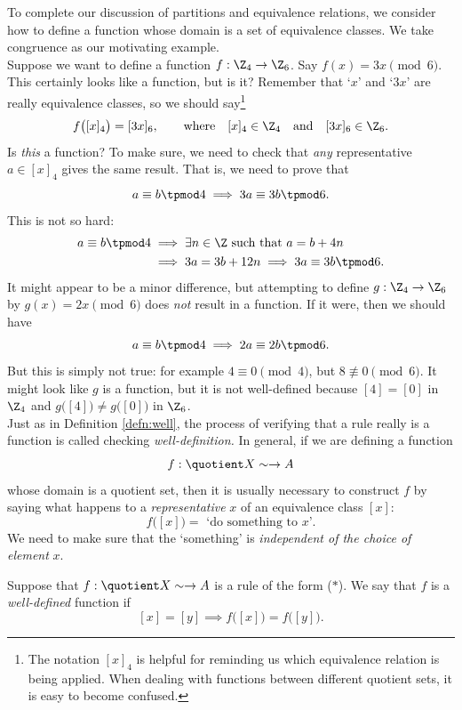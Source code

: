 To complete our discussion of partitions and equivalence relations, we consider how to define a function whose domain is a set of equivalence classes. We take congruence as our motivating example.\\

Suppose we want to define a function $f:\Z_4\to\Z_6$. Say $f(x)=3x\pmod 6$. This certainly looks like a function, but is it? Remember that `$x$' and `$3x$' are really equivalence classes, so we should say\footnote{The notation $[x]_4$ is helpful for reminding us which equivalence relation is being applied. When dealing with functions between different quotient sets, it is easy to become confused.}
\[f\bigl([x]_4\bigr)=[3x]_6,\qquad\text{where}\quad [x]_4\in\Z_4\quad\text{and}\quad [3x]_6\in\Z_6.\]
Is \emph{this} a function? To make sure, we need to check that \emph{any} representative $a\in[x]_4$ gives the same result. That is, we need to prove that
\[a\equiv b\tpmod 4\implies 3a\equiv 3b\tpmod 6.\]
This is not so hard:
\begin{align*}
a\equiv b\tpmod 4&\implies \exists n\in\Z\text{ such that }a=b+4n\\
&\implies 3a=3b+12n\implies 3a\equiv 3b\tpmod 6.
\end{align*}
It might appear to be a minor difference, but attempting to define $g:\Z_4\to\Z_6$ by $g(x)=2x\pmod 6$ does \emph{not} result in a function. If it were, then we should have
\[a\equiv b\tpmod 4\implies 2a\equiv 2b\tpmod 6.\]
But this is simply not true: for example $4\equiv 0\pmod 4$, but $8\not\equiv 0\pmod 6$. It might look like $g$ is a function, but it is not well-defined because $[4]=[0]$ in $\Z_4$ and $g\bigl([4]\bigr)\neq g\bigl([0]\bigr)$ in $\Z_6$.\\

Just as in Definition \ref{defn:well}, the process of verifying that a rule really is a function is called checking \emph{well-definition.} In general, if we are defining a function
\[f:\quotient X\sim\to A\]
whose domain is a quotient set, then it is usually necessary to construct $f$ by saying what happens to a \emph{representative} $x$ of an equivalence class $[x]$:
\[f\bigl([x]\bigr)=\text{ `do something to $x$'.}\tag*{($\ast$)}\]
We need to make sure that the `something' is \emph{independent of the choice of element} $x$.

\begin{defn}
Suppose that $f:\quotient X\sim\to A$ is a rule of the form ($\ast$). We say that $f$ is a \emph{well-defined} function if
\[[x]=[y]\implies f\bigl([x]\bigr)=f\bigl([y]\bigr).\]
\end{defn}

